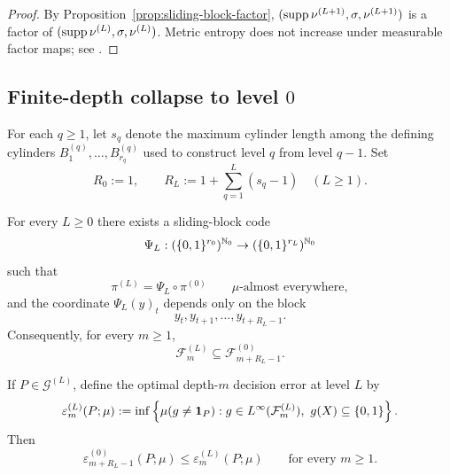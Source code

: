 \begin{proof}
By Proposition~\ref{prop:sliding-block-factor},
\((\operatorname{supp}\nu^{(L+1)},\sigma,\nu^{(L+1)})\) is a factor of
\((\operatorname{supp}\nu^{(L)},\sigma,\nu^{(L)})\).  Metric entropy does not increase
under measurable factor maps; see \citet[Chapter~4]{WaltersErgodicTheory}.
\end{proof}

\subsection{Finite-depth collapse to level \texorpdfstring{$0$}{0}}

\begin{definition}
\label{def:cumulative-prefix-budget}
For each \(q\geq 1\), let \(s_q\) denote the maximum cylinder length
among the defining cylinders \(B^{(q)}_1,\ldots,B^{(q)}_{r_q}\) used to
construct level \(q\) from level \(q-1\).  Set
\[
  R_0:=1,
  \qquad
  R_L:=1+\sum_{q=1}^{L}(s_q-1)
  \quad(L\geq 1).
\]
\end{definition}

\begin{theorem}
\label{thm:finite-depth-collapse}
For every \(L\geq 0\) there exists a sliding-block code
\[
  \Psi_L:(\{0,1\}^{r_0})^{\mathbb{N}_0}
  \to (\{0,1\}^{r_L})^{\mathbb{N}_0}
\]
such that
\[
  \pi^{(L)}=\Psi_L\circ\pi^{(0)}
  \qquad \mu\text{-almost everywhere},
\]
and the coordinate \(\Psi_L(y)_t\) depends only on the block
\[
  y_t,y_{t+1},\ldots,y_{t+R_L-1}.
\]
Consequently, for every \(m\geq 1\),
\[
  \mathcal{F}_m^{(L)}\subseteq \mathcal{F}_{m+R_L-1}^{(0)}.
\]

If \(P\in\mathcal{G}^{(L)}\), define the optimal depth-\(m\) decision
error at level \(L\) by
\[
  \varepsilon_m^{(L)}(P;\mu)
  := \inf\left\{
      \mu(g\neq\mathbf{1}_P):
      g\in L^\infty(\mathcal{F}_m^{(L)}),\ g(X)\subseteq\{0,1\}
     \right\}.
\]
Then
\[
  \varepsilon_{m+R_L-1}^{(0)}(P;\mu)
  \leq \varepsilon_m^{(L)}(P;\mu)
  \qquad\text{for every } m\geq 1.
\]
\end{theorem}

